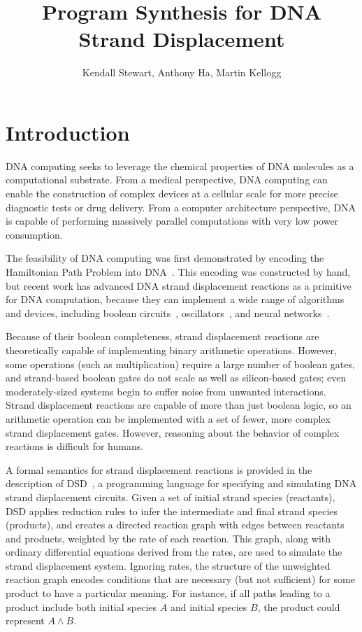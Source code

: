 \documentclass{article}
\begin{document}
\title{Program Synthesis for DNA Strand Displacement}
\author{Kendall Stewart, Anthony Ha, Martin Kellogg}

\maketitle

\section{Introduction}

DNA computing seeks to leverage the chemical properties
of DNA molecules as a computational substrate.
From a medical perspective, DNA computing can enable the
construction of complex devices at a cellular scale for more precise
diagnostic tests or drug delivery. From a computer architecture perspective,
DNA is capable of performing massively parallel computations with very low
power consumption.

The feasibility of DNA computing was first demonstrated by encoding the
Hamiltonian Path Problem into DNA~\cite{adelman}. This encoding was constructed
by hand, but recent work has advanced DNA strand displacement reactions as a
primitive for DNA computation, because they can implement a wide
range of algorithms and devices, including boolean circuits~\cite{strands},
oscillators~\cite{dsd}, and neural networks~\cite{strandnn}.

Because of their boolean completeness, strand displacement reactions are
theoretically capable of implementing binary arithmetic operations. However,
some operations (such as multiplication) require a large number of
boolean gates, and strand-based boolean gates do not scale as well as
silicon-based gates; even moderately-sized systems begin to suffer noise
from unwanted interactions. Strand displacement reactions are capable
of more than just boolean
logic, so an arithmetic operation can be implemented with a set of
fewer, more complex strand displacement gates. However, reasoning about the
behavior of complex reactions is difficult for humans.

A formal semantics for strand displacement reactions is provided in the
description of DSD~\cite{dsd}, a programming language for specifying and
simulating DNA strand displacement circuits. Given a set of initial strand
species (reactants), DSD applies reduction rules to infer the intermediate and
final strand species (products), and creates a directed reaction graph with
edges between reactants and products, weighted by the rate of each reaction.
This graph, along with ordinary differential equations derived from the rates,
are used to simulate the strand displacement system.
Ignoring rates, the structure of the unweighted reaction graph encodes
conditions that are necessary (but not sufficient) for some product to have a
particular meaning. For instance, if all paths leading to a product include both
initial species $A$ and initial species $B$, the product could
represent $A \land B$.
\end{document}
